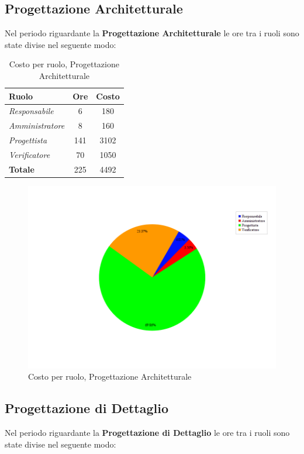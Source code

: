 \subsection{Progettazione Architetturale}
Nel periodo riguardante la \textbf{Progettazione Architetturale} le ore tra i ruoli sono state divise nel seguente modo:

\begin{table}[H]
	\begin{center}
		\begin{tabular}{|l|c|c|}
			\hline
			\textbf{Ruolo}	& \textbf{Ore} &	\textbf{Costo}	 \\
			\hline
			\textit{Responsabile}	&	6	&	180		\\
			\hline
			\textit{Amministratore}	&	8	&	160		\\
			\hline
			\textit{Progettista}		&	141	&	3102	\\
			\hline
			\textit{Verificatore}	&	70	&	1050	\\
			\hline
			\textbf{Totale}	&	225	&	4492	\\
			\hline
		\end{tabular}
	\end{center}
	\caption{Costo per ruolo, Progettazione Architetturale}
\end{table}

\begin{figure}[H]
	\centering
	\includegraphics[scale=0.4]{immagini/Grafi/CostoPA}
	\caption{Costo per ruolo, Progettazione Architetturale}
\end{figure}

\subsection{Progettazione di Dettaglio}
Nel periodo riguardante la \textbf{Progettazione di Dettaglio} le ore tra i ruoli sono state divise nel seguente modo:

